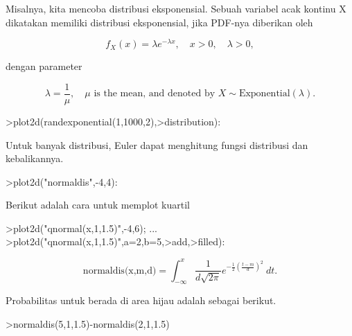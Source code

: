 \documentclass{article}
\begin{document}
\begin{eulernotebook}
\begin{eulercomment}
Misalnya, kita mencoba distribusi eksponensial. Sebuah variabel acak
kontinu X dikatakan memiliki distribusi eksponensial, jika PDF-nya
diberikan oleh\\
\end{eulercomment}
\begin{eulerformula}
\[
f_X(x)=\lambda e^{-\lambda x},\quad x>0,\quad \lambda>0,
\]
\end{eulerformula}
\begin{eulercomment}
dengan parameter\\
\end{eulercomment}
\begin{eulerformula}
\[
\lambda=\frac{1}{\mu},\quad \mu \text{ is the mean, and denoted by } X \sim \text{Exponential}(\lambda).
\]
\end{eulerformula}
\begin{eulerprompt}
>plot2d(randexponential(1,1000,2),>distribution):
\end{eulerprompt}
\begin{eulercomment}
Untuk banyak distribusi, Euler dapat menghitung fungsi distribusi dan
kebalikannya.
\end{eulercomment}
\begin{eulerprompt}
>plot2d("normaldis",-4,4): 
\end{eulerprompt}
\begin{eulercomment}
Berikut adalah cara untuk memplot kuartil
\end{eulercomment}
\begin{eulerprompt}
>plot2d("qnormal(x,1,1.5)",-4,6);  ...
>plot2d("qnormal(x,1,1.5)",a=2,b=5,>add,>filled):
\end{eulerprompt}
\begin{eulerformula}
\[
\text{normaldis(x,m,d)}=\int_{-\infty}^x \frac{1}{d\sqrt{2\pi}}e^{-\frac{1}{2}(\frac{t-m}{d})^2}\ dt.
\]
\end{eulerformula}
\begin{eulercomment}
Probabilitas untuk berada di area hijau adalah sebagai berikut.
\end{eulercomment}
\begin{eulerprompt}
>normaldis(5,1,1.5)-normaldis(2,1,1.5)
\end{eulerprompt}
\begin{euleroutput}

\end{euleroutput}
\end{eulernotebook}
\end{document}
